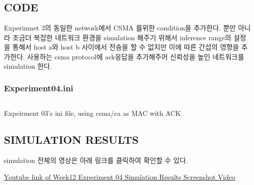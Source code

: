 \vspace{-3mm}
\section{}
\vspace{-4mm}
\subsection*{CODE}
\vspace{-3mm}
Experimnet 3의 동일한 network에서 CSMA 를위한 condition을 추가한다. 뿐만 아니라 조금더 복잡한 네트워크 환경을 simulation 해주기 위해서 inference range의 설정을 통해서 host a와 host b 사이에서 전송을 할 수 없지만 이에 따른 간섭의 영향을 추가한다.
사용하는 csma protocol에 ack응답을 추가해주어 신뢰성을 높인 네트워크를 simulation 한다.
\vspace{-3mm}
\subsubsection*{Experiment04.ini}
    \vspace{-2mm}
    \begin{listing}[h!]
    \inputminted[framerule = 1pt,framesep = 2mm , frame = lines, fontsize=\footnotesize ]{c}{./code/week12/Experiment_04/ini.cpp}
    \vspace{-3mm}
    \caption{\footnotesize Expeirment 03's ini file, using csma/ca as MAC with ACK}
    \end{listing}
    \vspace{-6mm} 
\subsection*{SIMULATION RESULTS}
    simulation 전체의 영상은 아래 링크를 클릭하여 확인할 수 있다.     
    \vspace{-10mm}
        \begin{center}
            \item \href{https://www.youtube.com/watch?v=WlI24BkZjFs&ab_channel=anamnesis}
        	{Youtube link of Week12 Experiment 04 Simulation Results Screenshot Video}
        \end{center}
    \vspace{-6mm}
         
